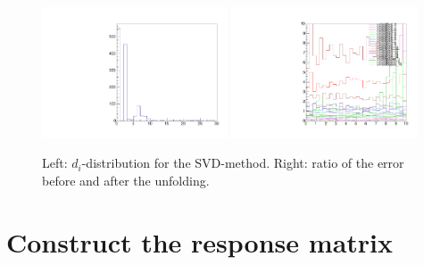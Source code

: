 \documentclass[a4paper,11pt]{article}
\begin{document}
\begin{figure}[H]
	\centering
	\includegraphics[width=0.49\textwidth]{figs/unfold-svd-ddistr.pdf}
	\includegraphics[width=0.49\textwidth]{figs/unfold-error-reg.pdf}
	\caption{ \label{fig:sol:reg2} Left: $d_i$-distribution for the \gls{SVD}-method. Right: ratio of the error before and after the unfolding.}
\end{figure}

\FloatBarrier
\section{Construct the response matrix}
\end{document}
